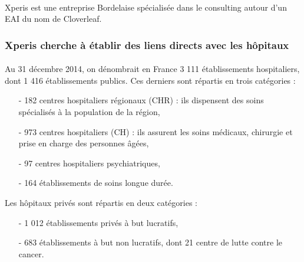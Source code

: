 			\paragraph{}%
			Xperis est une entreprise Bordelaise spécialisée dans le
			consulting autour d'un EAI du nom de Cloverleaf.
			
			\paragraph{}%
			
			\paragraph{}%
			
		\subsubsection{Xperis cherche à établir des liens directs avec les hôpitaux}
			\paragraph{}%
			Au 31 décembre 2014, on dénombrait en France 3 111 établissements hospitaliers, 
			dont 1 416 établissements publics. Ces derniers sont répartis en trois catégories 
			\citep{drees_panoramas_2016} :
			\begin{itemize}
				\item[-] 182 centres hospitaliers régionaux (CHR) : ils dispensent des soins 
				spécialisés à la population de la région,
				\item[-] 973 centres hospitaliers (CH) : ils assurent les soins médicaux, 
				chirurgie et prise en charge des personnes âgées,
				\item[-] 97 centres hospitaliers psychiatriques,
				\item[-] 164 établissements de soins longue durée.
			\end{itemize}
			Les hôpitaux privés sont répartis en deux catégories :
			\begin{itemize}
				\item[-] 1 012 établissements privés à but lucratifs,
				\item[-] 683 établissements à but non lucratifs, dont 21 centre de lutte contre 
				le cancer.
			\end{itemize}
			
